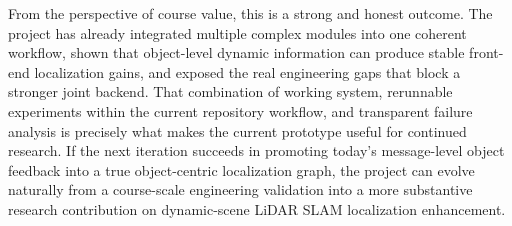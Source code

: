 \documentclass[a4paper,12pt]{article}
\begin{document}
From the perspective of course value, this is a strong and honest outcome. The project has already integrated multiple complex modules into one coherent workflow, shown that object-level dynamic information can produce stable front-end localization gains, and exposed the real engineering gaps that block a stronger joint backend. That combination of working system, rerunnable experiments within the current repository workflow, and transparent failure analysis is precisely what makes the current prototype useful for continued research. If the next iteration succeeds in promoting today's message-level object feedback into a true object-centric localization graph, the project can evolve naturally from a course-scale engineering validation into a more substantive research contribution on dynamic-scene LiDAR SLAM localization enhancement.
\end{document}
